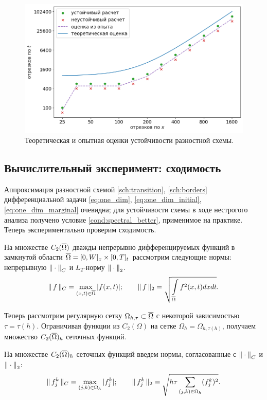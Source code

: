 \begin{figure}[!tp]
	\centering
	\includegraphics[width=\textwidth]{figures/stability_bounds.png}
	\vspace{-0.7cm}
	\caption{Теоретическая и опытная оценки устойчивости разностной схемы.}
	\label{fig:stability_bounds}
\end{figure}


\subsection{Вычислительный эксперимент: сходимость}

Аппроксимация разностной схемой \eqref{sch:transition}, \eqref{sch:borders} дифференциальной задачи \eqref{eq:one_dim}, \eqref{eq:one_dim_initial}, \eqref{eq:one_dim_marginal} очевидна; для устойчивости схемы в ходе нестрогого анализа получено условие \eqref{cond:spectral_better}, применимое на практике. Теперь экспериментально проверим сходимость.

На множестве $C_2({\overline{\Omega}})$ дважды непрерывно дифференцируемых функций в замкнутой области ${\overline{\Omega}} = [0, W]_x \times [0, T]_t$ рассмотрим следующие нормы: непрерывную ${\| \cdot \|}_C$ и $L_2$-норму ${\| \cdot \|}_2$.
$$\| \, f \, \|_C = \max \limits_{(x, t) \in {\overline{\Omega}}} |f(x, t)|; \qquad \| \, f \, \|_2 = \sqrt{\int \limits_{{\overline{\Omega}}} f^2(x, t) dx dt} {\text{.}}$$

Теперь рассмотрим регулярную сетку $\Omega_{h, \tau} \subset {\overline{\Omega}}$ с некоторой зависимостью $\tau = \tau(h)$. Ограничивая функции из $C_2(\Omega)$ на сетке $\Omega_h = \Omega_{h, \tau(h)}$, получаем множество $C_2({\overline{\Omega}})_h$ сеточных функций.

На множестве $C_2({\overline{\Omega}})_h$ сеточных функций введем нормы, согласованные с ${\| \cdot \|}_C$ и ${\| \cdot \|}_2$:
$$\| \, f_j^k \, \|_C = \max \limits_{(j, k) \in \Omega_h} |f_j^k|; \qquad \| \, f_j^k \, \|_2 = \sqrt{h \tau \sum \limits_{(j, k) \in \Omega_h} (f_j^k)^2} {\text{.}}$$

